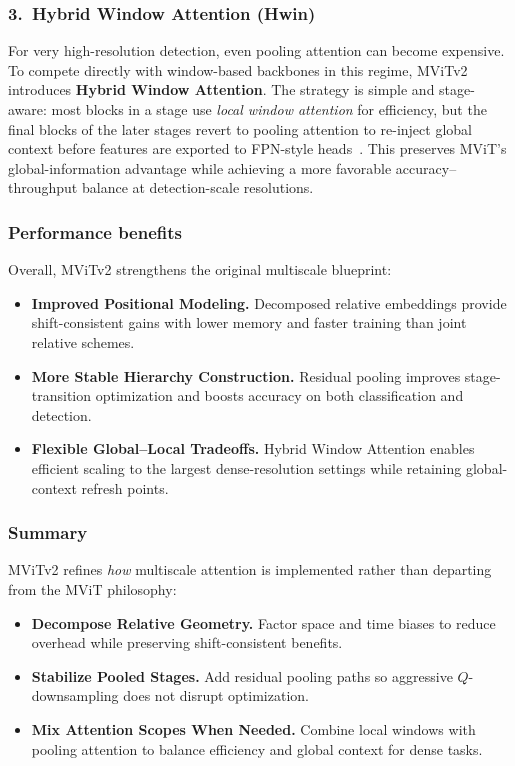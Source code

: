 \subsubsection{3.\ Hybrid Window Attention (Hwin)}
\noindent
For very high-resolution detection, even pooling attention can become expensive.
To compete directly with window-based backbones in this regime, MViTv2 introduces \textbf{Hybrid Window Attention}.
The strategy is simple and stage-aware:
most blocks in a stage use \emph{local window attention} for efficiency, but the final blocks of the later stages revert to pooling attention to re-inject global context before features are exported to FPN-style heads~\cite{li2021_improved_mvit}.
This preserves MViT’s global-information advantage while achieving a more favorable accuracy--throughput balance at detection-scale resolutions.

\newpage

\subsubsection{Performance benefits}
\noindent
Overall, MViTv2 strengthens the original multiscale blueprint:
\begin{itemize}
	\item \textbf{Improved Positional Modeling.} Decomposed relative embeddings provide shift-consistent gains with lower memory and faster training than joint relative schemes. 
	\item \textbf{More Stable Hierarchy Construction.} Residual pooling improves stage-transition optimization and boosts accuracy on both classification and detection. 
	\item \textbf{Flexible Global--Local Tradeoffs.} Hybrid Window Attention enables efficient scaling to the largest dense-resolution settings while retaining global-context refresh points. 
\end{itemize}

\subsubsection{Summary}
\noindent
MViTv2 refines \emph{how} multiscale attention is implemented rather than departing from the MViT philosophy:
\begin{itemize}
	\item \textbf{Decompose Relative Geometry.} Factor space and time biases to reduce overhead while preserving shift-consistent benefits. 
	\item \textbf{Stabilize Pooled Stages.} Add residual pooling paths so aggressive \(Q\)-downsampling does not disrupt optimization. 
	\item \textbf{Mix Attention Scopes When Needed.} Combine local windows with pooling attention to balance efficiency and global context for dense tasks. 
\end{itemize}

